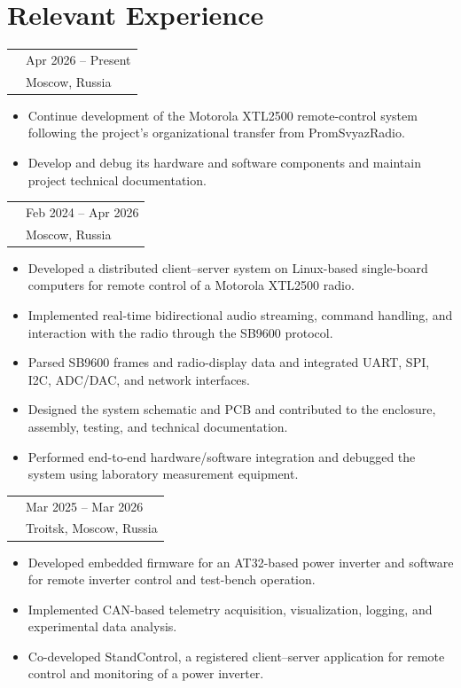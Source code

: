 \documentclass[10pt,a4paper]{article}
\makeatletter
\newcommand{\cvrole}[4]{%
  \begin{tabularx}{\textwidth}{@{}>{\raggedright\arraybackslash}X
    >{\raggedleft\arraybackslash}p{0.27\textwidth}@{}}
    {\sffamily\bfseries #1} & {\small\color{textgray}#4} \\
    {\itshape #2} & {\small\color{lightgray}#3}
  \end{tabularx}
  \vspace{0.12em}
}
\makeatother
\begin{document}
\section{Relevant Experience}

\cvrole{TIENDA LLC}
       {Engineer, Technical Department}
       {Moscow, Russia}{Apr 2026 -- Present}
\begin{itemize}
  \item Continue development of the Motorola XTL2500 remote-control system
        following the project's organizational transfer from PromSvyazRadio.
  \item Develop and debug its hardware and software components and maintain
        project technical documentation.
\end{itemize}

\vspace{0.35em}
\cvrole{PromSvyazRadio LLC}
       {Assistant to the Chief Engineer, Technical Department}
       {Moscow, Russia}{Feb 2024 -- Apr 2026}
\begin{itemize}
  \item Developed a distributed client--server system on Linux-based
        single-board computers for remote control of a Motorola XTL2500 radio.
  \item Implemented real-time bidirectional audio streaming, command handling,
        and interaction with the radio through the SB9600 protocol.
  \item Parsed SB9600 frames and radio-display data and integrated UART, SPI,
        I2C, ADC/DAC, and network interfaces.
  \item Designed the system schematic and PCB and contributed to the enclosure,
        assembly, testing, and technical documentation.
  \item Performed end-to-end hardware/software integration and debugged the
        system using laboratory measurement equipment.
\end{itemize}

\vspace{0.35em}
\cvrole{AmpereMagnete}
       {Engineering Intern, Artificial Intelligence Group}
       {Troitsk, Moscow, Russia}{Mar 2025 -- Mar 2026}
\begin{itemize}
  \item Developed embedded firmware for an AT32-based power inverter and
        software for remote inverter control and test-bench operation.
  \item Implemented CAN-based telemetry acquisition, visualization, logging,
        and experimental data analysis.
  \item Co-developed StandControl, a registered client--server application for
        remote control and monitoring of a power inverter.
\end{itemize}
\end{document}

